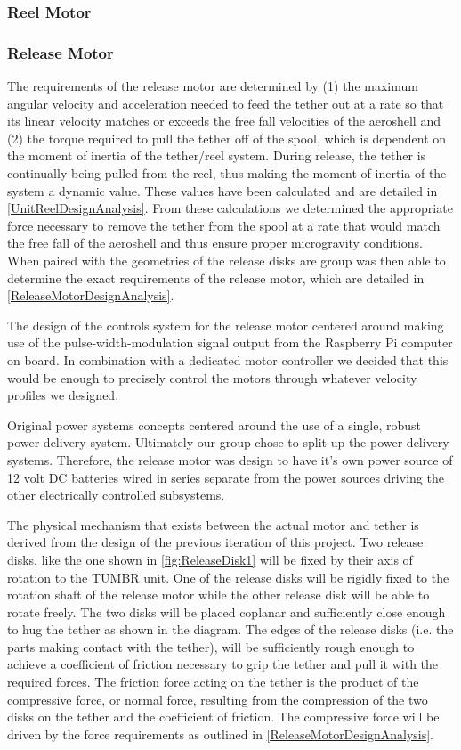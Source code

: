 \subsubsection{Reel Motor}

\subsubsection{Release Motor}

\indent\indent The requirements of the release motor are determined by (1) the maximum angular velocity and acceleration needed to feed the tether out at a rate so that its linear velocity matches or exceeds the free fall velocities of the aeroshell and (2) the torque required to pull the tether off of the spool, which is dependent on the moment of inertia of the tether/reel system. During release, the tether is continually being pulled from the reel, thus making the moment of inertia of the system a dynamic value. These values have been calculated and are detailed in \ref{UnitReelDesignAnalysis}. From these calculations we determined the appropriate force necessary to remove the tether from the spool at a rate that would match the free fall of the aeroshell and thus ensure proper microgravity conditions. When paired with the geometries of the release disks are group was then able to determine the exact requirements of the release motor, which are detailed in \ref{ReleaseMotorDesignAnalysis}.

The design of the controls system for the release motor centered around making use of the pulse-width-modulation signal output from the Raspberry Pi computer on board. In combination with a dedicated motor controller we decided that this would be enough to precisely control the motors through whatever velocity profiles we designed. 

Original power systems concepts centered around the use of a single, robust power delivery system. Ultimately our group chose to split up the power delivery systems. Therefore, the release motor was design to have it's own power source of 12 volt DC batteries wired in series separate from the power sources driving the other electrically controlled subsystems. 

The physical mechanism that exists between the actual motor and tether is derived from the design of the previous iteration of this project. Two release disks, like the one shown in \ref{fig:ReleaseDisk1} will be fixed by their axis of rotation to the TUMBR unit. One of the release disks will be rigidly fixed to the rotation shaft of the release motor while the other release disk will be able to rotate freely. The two disks will be placed coplanar and sufficiently close enough to hug the tether as shown in the diagram. The edges of the release disks (i.e. the parts making contact with the tether), will be sufficiently rough enough to achieve a coefficient of friction necessary to grip the tether and pull it with the required forces. The friction force acting on the tether is the product of the compressive force, or normal force, resulting from the compression of the two disks on the tether and the coefficient of friction. The compressive force will be driven by the force requirements as outlined in \ref{ReleaseMotorDesignAnalysis}.

